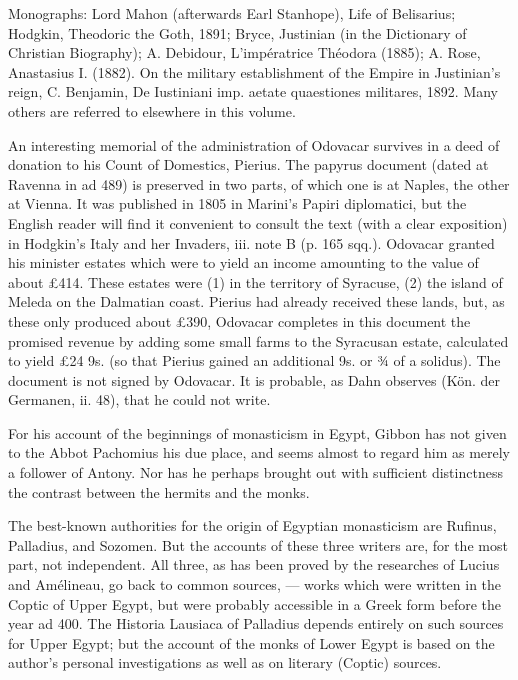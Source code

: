 Monographs: Lord Mahon (afterwards Earl Stanhope), Life of Belisarius; Hodgkin, Theodoric the Goth, 1891; Bryce, Justinian (in the Dictionary of Christian Biography); A. Debidour, L\texthebrew{}’impératrice Théodora (1885); A. Rose, Anastasius I. (1882). On the military establishment of the Empire in Justinian\texthebrew{}’s reign, C. Benjamin, De Iustiniani imp. aetate quaestiones militares, 1892. Many others are referred to elsewhere in this volume.


An interesting memorial of the administration of Odovacar survives in a deed of donation to his Count of Domestics, Pierius. The papyrus document (dated at Ravenna in ad 489) is preserved in two parts, of which one is at Naples, the other at Vienna. It was published in 1805 in Marini\texthebrew{}’s Papiri diplomatici, but the English reader will find it convenient to consult the text (with a clear exposition) in Hodgkin\texthebrew{}’s Italy and her Invaders, iii. note B (p. 165 sqq.). Odovacar granted his minister estates which were to yield an income amounting to the value of about £414. These estates were (1) in the territory of Syracuse, (2) the island of Meleda on the Dalmatian coast. Pierius had already received these lands, but, as these only produced about £390, Odovacar completes in this document the promised revenue by adding some small farms to the Syracusan estate, calculated to yield £24 9s. (so that Pierius gained an additional 9s. or ¾ of a solidus). The document is not signed by Odovacar. It is probable, as Dahn observes (Kön. der Germanen, ii. 48), that he could not write.


For his account of the beginnings of monasticism in Egypt, Gibbon has not given to the Abbot Pachomius his due place, and seems almost to regard him as merely a follower of Antony. Nor has he perhaps brought out with sufficient distinctness the contrast between the hermits and the monks.

The best-known authorities for the origin of Egyptian monasticism are Rufinus, Palladius, and Sozomen. But the accounts of these three writers are, for the most part, not independent. All three, as has been proved by the researches of Lucius and Amélineau, go back to common sources, \texthebrew{—} works which were written in the Coptic of Upper Egypt, but were probably accessible in a Greek form before the year ad 400. The Historia Lausiaca of Palladius depends entirely on such sources for Upper Egypt; but the account of the monks of Lower Egypt is based on the author\texthebrew{}’s personal investigations as well as on literary (Coptic) sources.

